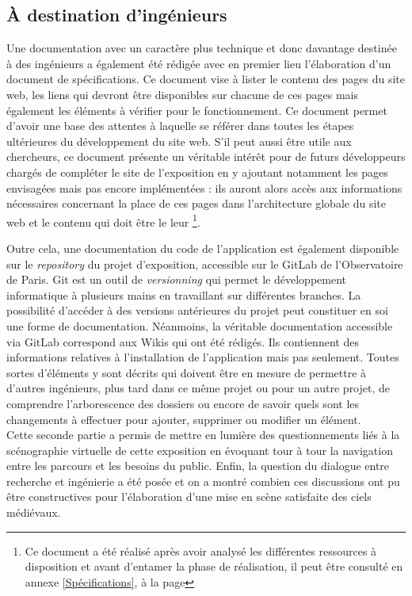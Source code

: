 	\subsection{À destination d'ingénieurs}
	Une documentation avec un caractère plus technique et donc davantage destinée à des ingénieurs a également été rédigée avec en premier lieu l'élaboration d'un document de spécifications. Ce document vise à lister le contenu des pages du site web, les liens qui devront être disponibles sur chacune de ces pages mais également les éléments à vérifier pour le fonctionnement. Ce document permet d'avoir une base des attentes à laquelle se référer dans toutes les étapes ultérieures du développement du site web. S'il peut aussi être utile aux chercheurs, ce document présente un véritable intérêt pour de futurs développeurs chargés de compléter le site de l'exposition en y ajoutant notamment les pages envisagées mais pas encore implémentées : ils auront alors accès aux informations nécessaires concernant la place de ces pages dans l'architecture globale du site web et le contenu qui doit être le leur \footnote{Ce document a été réalisé après avoir analysé les différentes ressources à disposition et avant d'entamer la phase de réalisation, il peut être consulté en annexe \ref{Spécifications}, à la page \pageref{Spécifications}}. 
	
	Outre cela, une documentation du code de l'application est également disponible sur le \textit{repository} du projet d'exposition, accessible sur le GitLab de l'Observatoire de Paris. Git est un outil de \textit{versionning} qui permet le développement informatique à plusieurs mains en travaillant sur différentes branches. La possibilité d'accéder à des versions antérieures du projet peut constituer en soi une forme de documentation. Néanmoins, la véritable documentation accessible via GitLab correspond aux Wikis qui ont été rédigés. Ils contiennent des informations relatives à l'installation de l'application mais pas seulement. Toutes sortes d'éléments y sont décrits qui doivent être en mesure de permettre à d'autres ingénieurs, plus tard dans ce même projet ou pour un autre projet, de comprendre l'arborescence des dossiers ou encore de savoir quels sont les changements à effectuer pour ajouter, supprimer ou modifier un élément. \\
	
	Cette seconde partie a permis de mettre en lumière des questionnements liés à la scénographie virtuelle de cette exposition en évoquant tour à tour la navigation entre les parcours et les besoins du public. Enfin, la question du dialogue entre recherche et ingénierie a été posée et on a montré combien ces discussions ont pu être constructives pour l'élaboration d'une mise en scène satisfaite des ciels médiévaux. 
	
